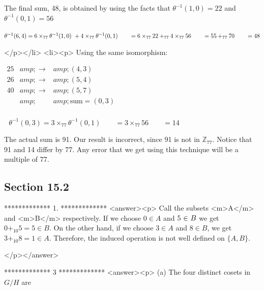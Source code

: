 The final sum, 48, is obtained by using the facts that \(\theta ^{-1}(1,0) =22\) and \(\theta ^{-1}(0,1)=56\)



\(\theta ^{-1}(6,4)=6 \times _{77}\theta ^{-1}(1,0)\text{  }+ 4 \times _{77}\theta ^{-1}(0,1)\\
\\
\quad \quad =6\times _{77}22 +_{77}4\times _{77}56\\
\\
\quad \quad =55 +_{77}70\\
\\
\quad \quad =48\)

</p></li>
<li><p>  Using the same isomorphism:



\(\begin{array}{ccc}
 25 &amp; \to  &amp; (4,3) \\
 26 &amp; \to  &amp; (5,4) \\
 40 &amp; \to  &amp; (5,7) \\
   &amp;   &amp; \text{sum}=(0,3)\text{            } \\
\end{array}\)



\(\text{              }\theta ^{-1}(0,3)= 3\times _{77}\theta ^{-1}(0,1)\quad \quad = 3\times _{77}56\quad \quad =14\)



The actual sum is 91. Our result is incorrect, since 91 is not in \(\mathbb{Z}_{77}\).  Notice that 91 and 14 differ by 77. Any error that we get
using this technique will be a multiple of 77.


\subsection{Section 15.2}

*************
1.
*************
<answer><p> Call the subsets <m>A</m> and <m>B</m> respectively. If we choose \(0 \in A\) and \(\text{5 $\in $ }\text{\textit{$B$}}\) we get \(0 +_{10}
5 =5\in  B\). On the other hand, if we choose \(3 \in A\) and \(8 \in  B\), we get \(3 +_{10}8 = 1 \in  A\). Therefore, the induced operation is
not well defined on \(\{A,B\}\).

</p></answer>


*************
3
*************
<answer><p> (a) The four distinct cosets in \(G/H\) are



